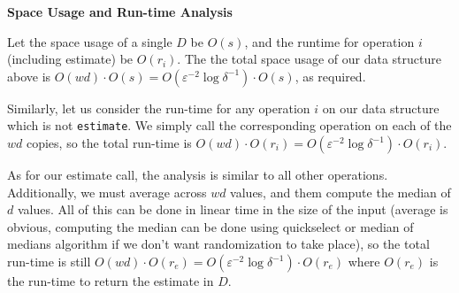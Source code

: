 \documentclass[12pt]{exam}
\newcommand*{\bigo}[1]{O \left( #1 \right)}
\newcommand*{\eps}{\varepsilon}  %
\begin{document}
\begin{questions}
\begin{solution}
\textbf{Space Usage and Run-time Analysis}

Let the space usage of a single $D$ be $\bigo{s}$, and the runtime for operation $i$ (including estimate) be $\bigo{r_i}$. The the total space usage of our data structure above is $\bigo{wd} \cdot \bigo{s} = \bigo{\eps^{-2} \log \delta^{-1}} \cdot \bigo{s}$, as required.

Similarly, let us consider the run-time for any operation $i$ on our data structure which is not \texttt{estimate}. We simply call the corresponding operation on each of the $wd$ copies, so the total run-time is $\bigo{wd} \cdot \bigo{r_i} = \bigo{\eps^{-2} \log \delta^{-1}} \cdot \bigo{r_i}$.

As for our estimate call, the analysis is similar to all other operations. Additionally, we must average across $wd$ values, and them compute the median of $d$ values. All of this can be done in linear time in the size of the input (average is obvious, computing the median can be done using quickselect or median of medians algorithm if we don't want randomization to take place), so the total run-time is still $\bigo{wd} \cdot \bigo{r_e} = \bigo{\eps^{-2} \log \delta^{-1}} \cdot \bigo{r_e}$ where $\bigo{r_e}$ is the run-time to return the estimate in $D$.

\end{solution}

\end{questions}
\end{document}
